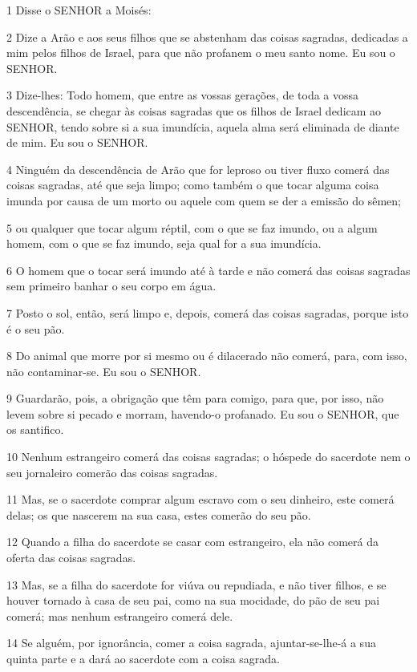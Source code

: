 \par 1 Disse o SENHOR a Moisés:
\par 2 Dize a Arão e aos seus filhos que se abstenham das coisas sagradas, dedicadas a mim pelos filhos de Israel, para que não profanem o meu santo nome. Eu sou o SENHOR.
\par 3 Dize-lhes: Todo homem, que entre as vossas gerações, de toda a vossa descendência, se chegar às coisas sagradas que os filhos de Israel dedicam ao SENHOR, tendo sobre si a sua imundícia, aquela alma será eliminada de diante de mim. Eu sou o SENHOR.
\par 4 Ninguém da descendência de Arão que for leproso ou tiver fluxo comerá das coisas sagradas, até que seja limpo; como também o que tocar alguma coisa imunda por causa de um morto ou aquele com quem se der a emissão do sêmen;
\par 5 ou qualquer que tocar algum réptil, com o que se faz imundo, ou a algum homem, com o que se faz imundo, seja qual for a sua imundícia.
\par 6 O homem que o tocar será imundo até à tarde e não comerá das coisas sagradas sem primeiro banhar o seu corpo em água.
\par 7 Posto o sol, então, será limpo e, depois, comerá das coisas sagradas, porque isto é o seu pão.
\par 8 Do animal que morre por si mesmo ou é dilacerado não comerá, para, com isso, não contaminar-se. Eu sou o SENHOR.
\par 9 Guardarão, pois, a obrigação que têm para comigo, para que, por isso, não levem sobre si pecado e morram, havendo-o profanado. Eu sou o SENHOR, que os santifico.
\par 10 Nenhum estrangeiro comerá das coisas sagradas; o hóspede do sacerdote nem o seu jornaleiro comerão das coisas sagradas.
\par 11 Mas, se o sacerdote comprar algum escravo com o seu dinheiro, este comerá delas; os que nascerem na sua casa, estes comerão do seu pão.
\par 12 Quando a filha do sacerdote se casar com estrangeiro, ela não comerá da oferta das coisas sagradas.
\par 13 Mas, se a filha do sacerdote for viúva ou repudiada, e não tiver filhos, e se houver tornado à casa de seu pai, como na sua mocidade, do pão de seu pai comerá; mas nenhum estrangeiro comerá dele.
\par 14 Se alguém, por ignorância, comer a coisa sagrada, ajuntar-se-lhe-á a sua quinta parte e a dará ao sacerdote com a coisa sagrada.
